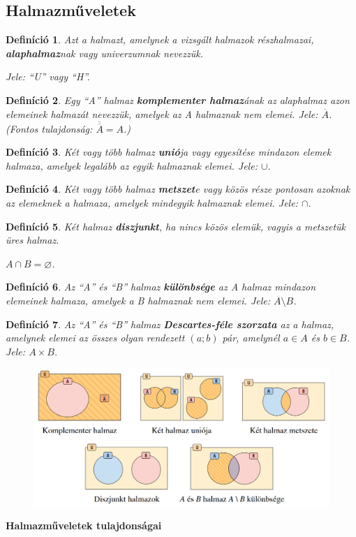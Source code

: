 \documentclass[12pt,a4paper]{article}
\newtheorem{definition}{Definíció} [section]
\begin{document}
\subsection{Halmazműveletek}

\begin{definition}
Azt a halmazt, amelynek a vizsgált halmazok részhalmazai, \textbf{alaphalmaz}nak vagy univerzumnak nevezzük.

Jele: ``U'' vagy ``H''.
\end{definition}

\begin{definition}
Egy ``A'' halmaz \textbf{komplementer halmaz}ának az alaphalmaz azon elemeinek halmazát nevezzük, amelyek az A halmaznak nem elemei. Jele: $\overline{A}$. (Fontos tulajdonság: $\overline{\overline{A}} = A$.)
\end{definition}

\begin{definition}
Két vagy több halmaz \textbf{unió}ja vagy egyesítése mindazon elemek halmaza, amelyek legalább az egyik halmaznak elemei. Jele: $\cup$.
\end{definition}

\begin{definition}
Két vagy több halmaz \textbf{metszet}e vagy közös része pontosan azoknak az elemeknek a halmaza, amelyek mindegyik halmaznak elemei. Jele: $\cap$.
\end{definition}

\begin{definition}
Két halmaz \textbf{diszjunkt}, ha nincs közös elemük, vagyis a metszetük üres halmaz.

$A\cap B=\varnothing$.
\end{definition}

\begin{definition}
Az ``A'' és ``B'' halmaz \textbf{különbsége} az A halmaz mindazon elemeinek halmaza, amelyek a B halmaznak nem elemei. Jele: $A \setminus B$.
\end{definition}

\begin{definition}
Az ``A'' és ``B'' halmaz \textbf{Descartes-féle szorzata} az a halmaz, amelynek elemei az összes olyan rendezett $(a; b)$ pár, amelynél $a\in A$ és $b\in B$. Jele: $A\times B$.
\end{definition}

\begin{figure}[h]
\centering
\includegraphics[scale=0.29]{img/halmazok}
\end{figure}
\newpage
\textbf{Halmazműveletek tulajdonságai}
\end{document}
